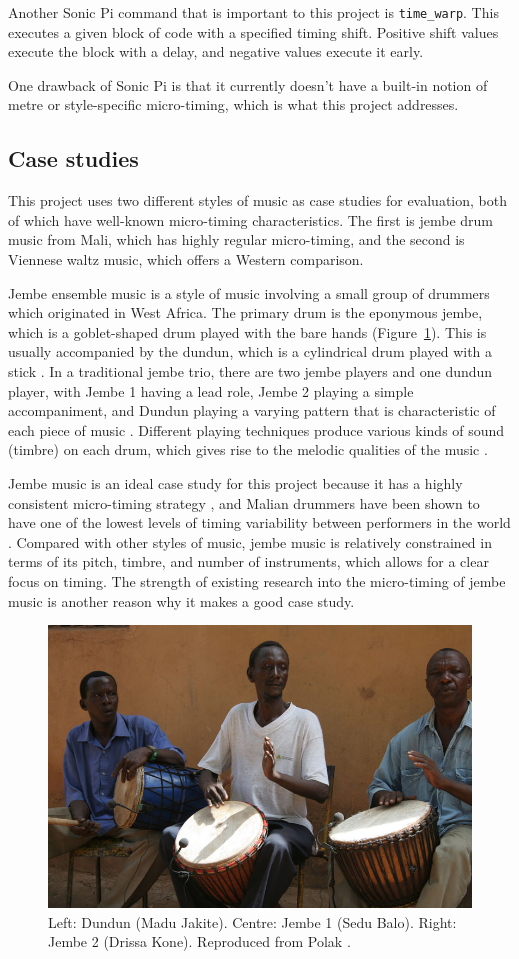 \documentclass[12pt,twoside,openright]{report}
\begin{document}
Another Sonic Pi command that is important to this project is \verb'time_warp'. This executes a given block of code with a specified timing shift. Positive shift values execute the block with a delay, and negative values execute it early.

One drawback of Sonic Pi is that it currently doesn't have a built-in notion of
metre or style-specific micro-timing, which is what this project addresses.


\subsection{Case studies} \label{case_studies}

This project uses two different styles of music as case studies for evaluation,
both of which have well-known micro-timing characteristics. The first is jembe
drum music from Mali, which has highly regular micro-timing, and the second is
Viennese waltz music, which offers a Western comparison.

Jembe ensemble music is a style of music involving a small group of drummers
which originated in West Africa. The primary drum is the eponymous jembe, which
is a goblet-shaped drum played with the bare hands (Figure~\ref{fig:jembe_photo}). This is usually accompanied
by the dundun, which is a cylindrical drum played with a stick \cite{polak2010}. In a
traditional jembe trio, there are two jembe players and one dundun player, with
Jembe 1 having a lead role, Jembe 2 playing a simple accompaniment, and Dundun
playing a varying pattern that is characteristic of each piece of music
\cite{jacoby2021}. Different playing techniques produce various kinds of sound
(timbre) on each drum, which gives rise to the melodic qualities of the music
\cite{polak2010}.

Jembe music is an ideal case study for this project because it has a highly
consistent micro-timing strategy \cite{polak2010}, and Malian drummers have been shown to
have one of the lowest levels of timing variability between performers in the
world \cite{clayton2020}. Compared with other styles of music, jembe music is
relatively constrained in terms of its pitch, timbre, and number of instruments,
which allows for a clear focus on timing. The strength of existing research \cite{polak2010,london2017,jacoby2021} into the micro-timing of jembe music is another reason why it makes a good case study.

\begin{figure}[ht]
    \centering
    \includegraphics[width=0.5\linewidth]{figures/polak_ex1.jpg}
    \caption{Left: Dundun (Madu Jakite). Centre: Jembe 1 (Sedu Balo). Right: Jembe 2 (Drissa Kone). Reproduced from Polak \cite{polak2010}.}
    \label{fig:jembe_photo}
\end{figure}
\end{document}
